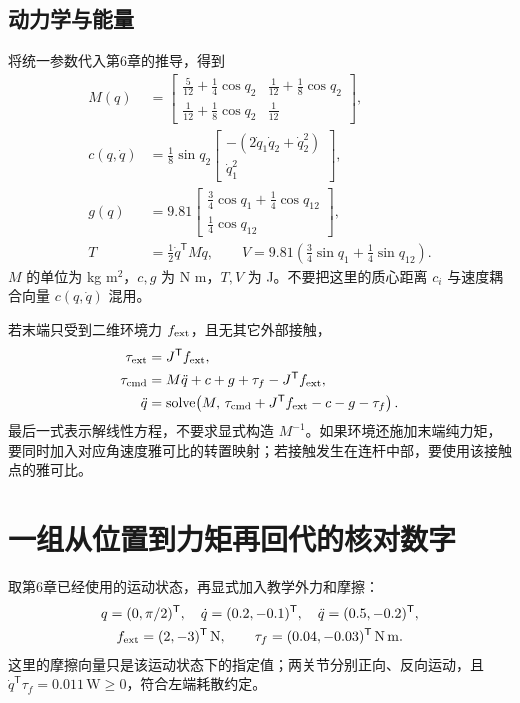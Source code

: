\subsection{动力学与能量}

将统一参数代入第6章的推导，得到
\begin{align}
M(q)&=\begin{bmatrix}
\frac5{12}+\frac14\cos q_2&\frac1{12}+\frac18\cos q_2\\
\frac1{12}+\frac18\cos q_2&\frac1{12}
\end{bmatrix},\\
c(q,\dot q)&=\frac18\sin q_2
\begin{bmatrix}-(2\dot q_1\dot q_2+\dot q_2^2)\\\dot q_1^2\end{bmatrix},\\
g(q)&=9.81\begin{bmatrix}
\frac34\cos q_1+\frac14\cos q_{12}\\
\frac14\cos q_{12}
\end{bmatrix},\\
T&=\tfrac12\dot q^{\mathsf T}M\dot q,\qquad
V=9.81\left(\tfrac34\sin q_1+\tfrac14\sin q_{12}\right).
\end{align}
$M$ 的单位为 kg m$^2$，$c,g$ 为 N m，$T,V$ 为 J。不要把这里的质心距离 $c_i$ 与速度耦合向量 $c(q,\dot q)$ 混用。

若末端只受到二维环境力 $f_{\rm ext}$，且无其它外部接触，
\begin{align}
\tau_{\rm ext}&=J^{\mathsf T}f_{\rm ext},\\
\tau_{\rm cmd}&=M\ddot q+c+g+\tau_f-J^{\mathsf T}f_{\rm ext},\\
\ddot q&=\operatorname{solve}\!\left(M,\,
\tau_{\rm cmd}+J^{\mathsf T}f_{\rm ext}-c-g-\tau_f\right).
\end{align}
最后一式表示解线性方程，不要求显式构造 $M^{-1}$。如果环境还施加末端纯力矩，要同时加入对应角速度雅可比的转置映射；若接触发生在连杆中部，要使用该接触点的雅可比。

\section{一组从位置到力矩再回代的核对数字}

取第6章已经使用的运动状态，再显式加入教学外力和摩擦：
\begin{gather}
q=(0,\pi/2)^{\mathsf T},\quad
\dot q=(0.2,-0.1)^{\mathsf T},\quad
\ddot q=(0.5,-0.2)^{\mathsf T},\\
f_{\rm ext}=(2,-3)^{\mathsf T}\,\mathrm N,\qquad
\tau_f=(0.04,-0.03)^{\mathsf T}\,\mathrm{N\,m}.
\end{gather}
这里的摩擦向量只是该运动状态下的指定值；两关节分别正向、反向运动，且 $\dot q^{\mathsf T}\tau_f=0.011\,\mathrm W\ge0$，符合左端耗散约定。

